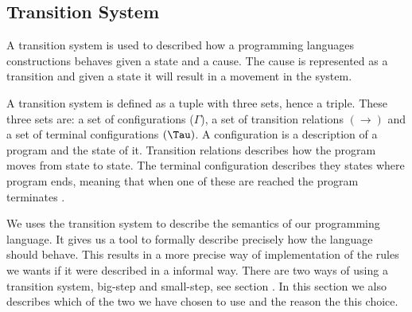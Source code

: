 \subsection{Transition System}
A transition system is used to described how a programming languages constructions behaves given a state and a cause. The cause is represented as a transition and given a state it will result in a movement in the system.

A transition system is defined as a tuple with three sets, hence a triple. These three sets are: a set of configurations ($\Gamma$), a set of transition relations $(\rightarrow)$ and a set of terminal configurations $(\Tau)$.
A configuration is a description of a program and the state of it. Transition relations describes how the program moves from state to state. The terminal configuration describes they states where program ends, meaning that when one of these are reached the program terminates \citep{HHTree}.

We uses the transition system to describe the semantics of our programming language. It gives us a tool to formally describe precisely how the language should behave. This results in a more precise way of implementation of the rules we wants if it were described in a informal way. There are two ways of using a transition system, big-step and small-step, see section . In this section we also describes which of the two we have chosen to use and the reason the this choice.